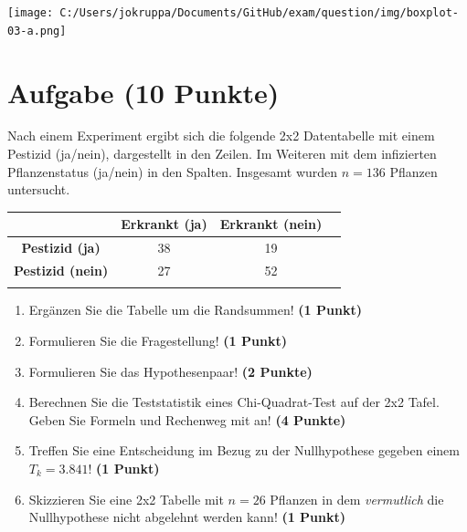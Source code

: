 \documentclass[a4paper, 10pt]{scrartcl}\usepackage[]{graphicx}\usepackage[]{color}
\begin{document}
\vspace*{8cm}

\begin{center}
  \texttt{[image: C:/Users/jokruppa/Documents/GitHub/exam/question/img/boxplot-03-a.png]}
\end{center}



 
\clearpage

\section{Aufgabe \hfill (10 Punkte)}



Nach einem Experiment ergibt sich die folgende 2x2 Datentabelle mit einem
Pestizid (ja/nein), dargestellt in den Zeilen. Im Weiteren mit dem
infizierten Pflanzenstatus (ja/nein) in den Spalten. Insgesamt wurden
$n = 136$ Pflanzen untersucht.
\vspace{5Ex}

\begin{center}
  \Large
  \begin{tabular}{c|c|c|c}
     & \textbf{Erkrankt (ja)} & \textbf{Erkrankt (nein)} &  \strut\\
    \hline
    \textbf{Pestizid (ja)} & 38  & 19  &     \strut\\
    \hline
    \textbf{Pestizid (nein)} & 27  & 52  &      \strut\\
    \hline
     \phantom{100} & \phantom{100}  & \phantom{100}  &  \phantom{100}  \strut\\
  \end{tabular}
\end{center}

\vspace{5Ex}

\begin{enumerate}
\item Erg{\"a}nzen Sie die Tabelle um die Randsummen! \textbf{(1 Punkt)} 
\item Formulieren Sie die Fragestellung! \textbf{(1 Punkt)}
\item Formulieren Sie das Hypothesenpaar! \textbf{(2 Punkte)}
\item Berechnen Sie die Teststatistik eines Chi-Quadrat-Test auf der 2x2
  Tafel. Geben Sie Formeln und Rechenweg mit an! \textbf{(4 Punkte)}
\item Treffen Sie eine Entscheidung im Bezug zu der Nullhypothese gegeben
  einem $T_k = 3.841$! \textbf{(1 Punkt)}
\item Skizzieren Sie eine 2x2 Tabelle mit
  $n = 26$ Pflanzen in dem \textit{vermutlich}
  die Nullhypothese nicht abgelehnt werden kann! \textbf{(1 Punkt)}
\end{enumerate} 
\clearpage
\end{document}
